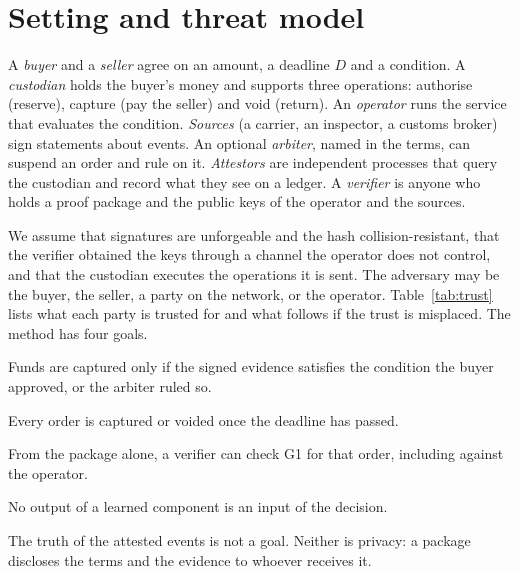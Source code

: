 \documentclass[10pt,a4paper]{article}
\theoremstyle{tight}
\begin{document}
\section{Setting and threat model}\label{sec:setting}

A \emph{buyer} and a \emph{seller} agree on an amount, a deadline $D$ and a condition. A \emph{custodian} holds the
buyer's money and supports three operations: authorise (reserve), capture (pay the seller) and void (return). An
\emph{operator} runs the service that evaluates the condition. \emph{Sources} (a carrier, an inspector, a customs
broker) sign statements about events. An optional \emph{arbiter}, named in the terms, can suspend an order and rule
on it. \emph{Attestors} are independent processes that query the custodian and record what they see on a ledger. A
\emph{verifier} is anyone who holds a proof package and the public keys of the operator and the sources.

We assume that signatures are unforgeable and the hash collision-resistant, that the verifier obtained the keys
through a channel the operator does not control, and that the custodian executes the operations it is sent. The
adversary may be the buyer, the seller, a party on the network, or the operator. Table~\ref{tab:trust} lists what
each party is trusted for and what follows if the trust is misplaced. The method has four goals.
\begin{description}[leftmargin=1.5em,itemsep=0pt,topsep=2pt,font=\normalfont\itshape]
\item[G1, evidence-bound release.] Funds are captured only if the signed evidence satisfies the condition the buyer
approved, or the arbiter ruled so.
\item[G2, bounded termination.] Every order is captured or voided once the deadline has passed.
\item[G3, third-party verifiability.] From the package alone, a verifier can check G1 for that order, including
against the operator.
\item[G4, advisory non-interference.] No output of a learned component is an input of the decision.
\end{description}
The truth of the attested events is not a goal. Neither is privacy: a package discloses the terms and the evidence
to whoever receives it.
\end{document}
